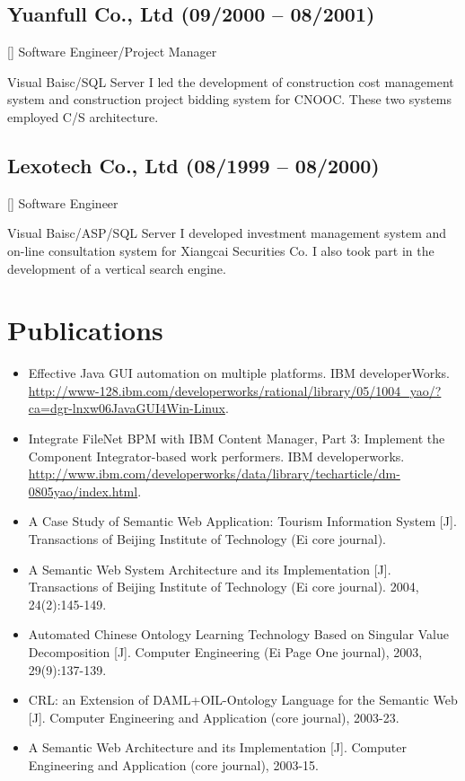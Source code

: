 \documentclass[a4paper]{article}
\newenvironment{DUlineblock}[1]{%
    \list{}{\setlength{\partopsep}{\parskip}
            \addtolength{\partopsep}{\baselineskip}
            \setlength{\topsep}{0pt}
            \setlength{\itemsep}{0.15\baselineskip}
            \setlength{\parsep}{0pt}
            \setlength{\leftmargin}{#1}}
    \raggedright
  }
  {\endlist}
\begin{document}
\begin{CJK}{UTF8}{gkai}
\subsection*{Yuanfull Co., Ltd (09/2000 – 08/2001)}
\begin{DUlineblock}{0em}
\item[] Software Engineer/Project Manager
\item[] Visual Baisc/SQL Server
\end{DUlineblock}
I led the development of construction cost management system and construction
project bidding system for CNOOC. These two systems employed C/S architecture.

\subsection*{Lexotech Co., Ltd (08/1999 – 08/2000)}
\begin{DUlineblock}{0em}
\item[] Software Engineer
\item[] Visual Baisc/ASP/SQL Server
\end{DUlineblock}
I developed investment management system  and on-line consultation system for
Xiangcai Securities Co. I also took part in the development of a vertical
search engine.

\section*{Publications}
\begin{itemize}

\item Effective Java GUI automation on multiple platforms. IBM developerWorks.
\url{http://www-128.ibm.com/developerworks/rational/library/05/1004_yao/?ca=dgr-lnxw06JavaGUI4Win-Linux}.
\item Integrate FileNet BPM with IBM Content Manager, Part 3: Implement the
Component Integrator-based work performers. IBM
developerworks. \url{http://www.ibm.com/developerworks/data/library/techarticle/dm-0805yao/index.html}.
\item A Case Study of Semantic Web Application: Tourism Information System {[}J{]}.
Transactions of Beijing Institute of Technology (Ei core journal).
\item A Semantic Web System Architecture and its Implementation {[}J{]}. Transactions
of Beijing Institute of Technology (Ei core journal). 2004, 24(2):145-149.
\item Automated Chinese Ontology Learning Technology Based on Singular Value
Decomposition {[}J{]}. Computer Engineering (Ei Page One journal), 2003,
29(9):137-139.
\item CRL: an Extension of DAML+OIL-Ontology Language for the Semantic Web {[}J{]}.
Computer Engineering and Application (core journal), 2003-23.
\item A Semantic Web Architecture and its Implementation {[}J{]}. Computer Engineering
and Application (core journal), 2003-15.
\end{itemize}
\end{CJK}
\end{document}
